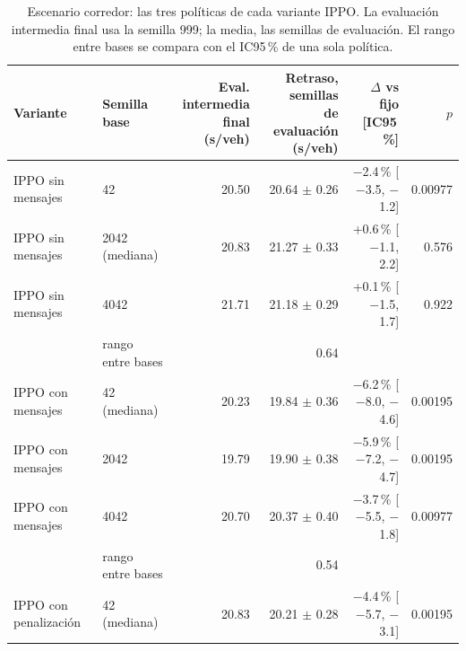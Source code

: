 \begin{table}[H]
\centering
\scriptsize
\setlength{\tabcolsep}{3pt}
\begin{tabular}{llrrrr}
\toprule
Variante & Semilla base & \makecell{Eval. intermedia\\final (s/veh)} & \makecell{Retraso, semillas\\de evaluación (s/veh)} & $\Delta$ vs fijo [IC95\,\%] & $p$ \\
\midrule
IPPO sin mensajes & 42 & 20.50 & 20.64 $\pm$ 0.26 & $-$2.4\,\% [$-$3.5, $-$1.2] & 0.00977 \\
IPPO sin mensajes & 2042 (mediana) & 20.83 & 21.27 $\pm$ 0.33 & +0.6\,\% [$-$1.1, 2.2] & 0.576 \\
IPPO sin mensajes & 4042 & 21.71 & 21.18 $\pm$ 0.29 & +0.1\,\% [$-$1.5, 1.7] & 0.922 \\
 & rango entre bases & & 0.64 & & \\
IPPO con mensajes & 42 (mediana) & 20.23 & 19.84 $\pm$ 0.36 & $-$6.2\,\% [$-$8.0, $-$4.6] & 0.00195 \\
IPPO con mensajes & 2042 & 19.79 & 19.90 $\pm$ 0.38 & $-$5.9\,\% [$-$7.2, $-$4.7] & 0.00195 \\
IPPO con mensajes & 4042 & 20.70 & 20.37 $\pm$ 0.40 & $-$3.7\,\% [$-$5.5, $-$1.8] & 0.00977 \\
 & rango entre bases & & 0.54 & & \\
IPPO con penalización & 42 (mediana) & 20.83 & 20.21 $\pm$ 0.28 & $-$4.4\,\% [$-$5.7, $-$3.1] & 0.00195 \\
\bottomrule
\end{tabular}
\caption[Escenario corredor: fragilidad del entrenamiento IPPO]{Escenario corredor: las tres políticas de cada variante IPPO. La evaluación intermedia final usa la semilla 999; la media, las semillas de evaluación. El rango entre bases se compara con el IC95\,\% de una sola política.}
\label{tab:corredor-fragilidad}
\end{table}
